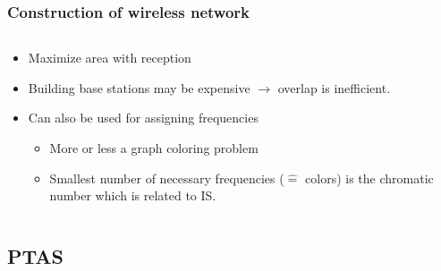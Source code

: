 \documentclass{beamer}
\begin{document}
\begin{frame}
\frametitle{Construction of wireless network \cite{chamaret} }
 \begin{columns}[T]
    \begin{column}{.63\textwidth}
  {
\begin{itemize}
\item<1-> Maximize area with reception
\item<2-> Building base stations may be expensive $\rightarrow$ overlap is inefficient.
\item<5-> Can also be used for assigning frequencies
\begin{itemize}
\item More or less a graph coloring problem
\item Smallest number of necessary frequencies ($\hat{=}$ colors) is the chromatic number \cite{mcdiarmid} which is related to IS.
\end{itemize}
\end{itemize}
}

    \end{column}
    \begin{column}{.37\textwidth}

    {
    }

    \end{column}
  \end{columns}
\end{frame}


\subsection{PTAS}
\end{document}
